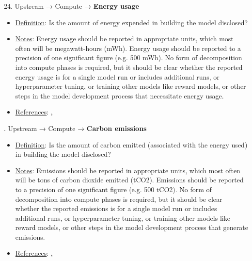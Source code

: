 24. Upstream → Compute → \textbf{Energy usage}
\vspace{-\parskip}
\begin{itemize}
\item
\underline{Definition}: Is the amount of energy expended in building the model disclosed?
\item
\underline{Notes}: Energy usage should be reported in appropriate units, which most often will be megawatt-hours (mWh). Energy usage should be reported to a precision of one significant figure (e.g. 500 mWh). No form of decomposition into compute phases is required, but it should be clear whether the reported energy usage is for a single model run or includes additional runs, or hyperparameter tuning, or training other models like reward models, or other steps in the model development process that necessitate energy usage.
\item
\underline{References}: \citet{lacoste2019quantifying}, \citet{patterson2021carbon}
\end{itemize} \vspace{\baselineskip}


. Upstream → Compute → \textbf{Carbon emissions}
\vspace{-\parskip}
\begin{itemize}
\item
\underline{Definition}: Is the amount of carbon emitted (associated with the energy used) in building the model disclosed?
\item
\underline{Notes}: Emissions should be reported in appropriate units, which most often will be tons of carbon dioxide emitted (tCO2). Emissions should be reported to a precision of one significant figure (e.g. 500 tCO2). No form of decomposition into compute phases is required, but it should be clear whether the reported emissions is for a single model run or includes additional runs, or hyperparameter tuning, or training other models like reward models, or other steps in the model development process that generate emissions.
\item
\underline{References}: \citet{lacoste2019quantifying}, \citet{patterson2021carbon}
\end{itemize} \vspace{\baselineskip}


